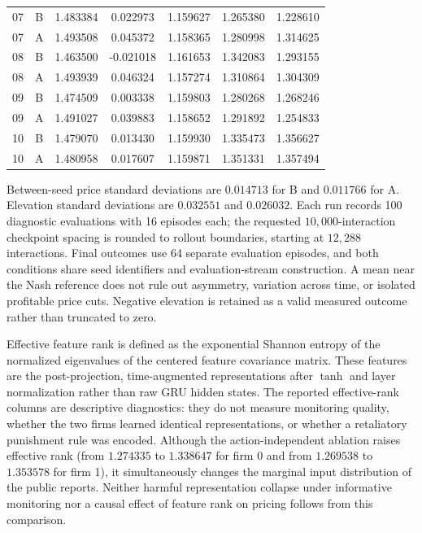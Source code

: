 \documentclass{article}
\begin{document}
\begin{table}[H]
\begin{tabular}{@{}ccS S[table-format=-1.6] SSS@{}}
07 & B & 1.483384 & 0.022973 & 1.159627 & 1.265380 & 1.228610 \\
07 & A & 1.493508 & 0.045372 & 1.158365 & 1.280998 & 1.314625 \\
08 & B & 1.463500 & -0.021018 & 1.161653 & 1.342083 & 1.293155 \\
08 & A & 1.493939 & 0.046324 & 1.157274 & 1.310864 & 1.304309 \\
09 & B & 1.474509 & 0.003338 & 1.159803 & 1.280268 & 1.268246 \\
09 & A & 1.491027 & 0.039883 & 1.158652 & 1.291892 & 1.254833 \\
10 & B & 1.479070 & 0.013430 & 1.159930 & 1.335473 & 1.356627 \\
10 & A & 1.480958 & 0.017607 & 1.159871 & 1.351331 & 1.357494 \\
\bottomrule
\end{tabular}
\end{table}

Between-seed price standard deviations are $0.014713$ for B and $0.011766$ for A. Elevation standard deviations are $0.032551$ and $0.026032$. Each run records 100 diagnostic evaluations with 16 episodes each; the requested $10{,}000$-interaction checkpoint spacing is rounded to rollout boundaries, starting at $12{,}288$ interactions. Final outcomes use 64 separate evaluation episodes, and both conditions share seed identifiers and evaluation-stream construction. A mean near the Nash reference does not rule out asymmetry, variation across time, or isolated profitable price cuts. Negative elevation is retained as a valid measured outcome rather than truncated to zero.

Effective feature rank is defined as the exponential Shannon entropy of the normalized eigenvalues of the centered feature covariance matrix. These features are the post-projection, time-augmented representations after $\tanh$ and layer normalization rather than raw GRU hidden states. The reported effective-rank columns are descriptive diagnostics: they do not measure monitoring quality, whether the two firms learned identical representations, or whether a retaliatory punishment rule was encoded. Although the action-independent ablation raises effective rank (from $1.274335$ to $1.338647$ for firm 0 and from $1.269538$ to $1.353578$ for firm 1), it simultaneously changes the marginal input distribution of the public reports. Neither harmful representation collapse under informative monitoring nor a causal effect of feature rank on pricing follows from this comparison.
\end{document}
